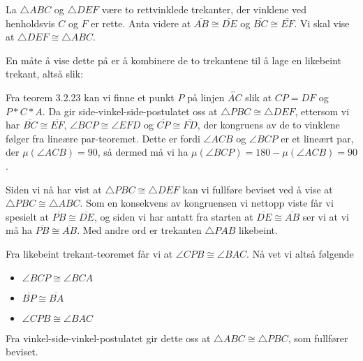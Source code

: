 \begin{oppgave}[4.2.4]
    La $\triangle ABC$ og $\triangle DEF$ være to rettvinklede trekanter, der vinklene ved henholdsvis $C$ og $F$ er rette. 
    Anta videre at $\overline{AB}\cong \overline{DE}$ og $\overline{BC}\cong \overline{EF}$. 
    Vi skal vise at $\triangle DEF \cong \triangle ABC$. 

    En måte å vise dette på er å kombinere de to trekantene til å lage en likebeint trekant, altså slik: 

    \begin{figure}[H]
        \centering
        
    \end{figure}

    Fra teorem 3.2.23 kan vi finne et punkt $P$ på linjen $\overleftrightarrow{AC}$ slik at $CP=DF$ og $P\ast C\ast A$. 
    Da gir side-vinkel-side-postulatet oss at $\triangle PBC\cong \triangle DEF$, ettersom vi har $\overline{BC}\cong \overline{EF}$, $\angle BCP \cong \angle EFD$ og $\overline{CP}\cong \overline{FD}$, der kongruens av de to vinklene følger fra lineære par-teoremet. 
    Dette er fordi $\angle ACB$ og $\angle BCP$ er et lineært par, der $\mu(\angle ACB)=90$, så dermed må vi ha $\mu(\angle BCP)=180-\mu(\angle ACB)=90$. 
    
    Siden vi nå har vist at $\triangle PBC\cong \triangle DEF$ kan vi fullføre beviset ved å vise at $\triangle PBC\cong \triangle ABC$. 
    Som en konsekvens av kongruensen vi nettopp viste får vi spesielt at $\overline{PB}\cong \overline{DE}$, og siden vi har antatt fra starten at $\overline{DE}\cong \overline{AB}$ ser vi at vi må ha $\overline{PB}\cong \overline{AB}$. 
    Med andre ord er trekanten $\triangle PAB$ likebeint. 

    Fra likebeint trekant-teoremet får vi at $\angle CPB \cong \angle BAC$. Nå vet vi altså følgende 
    \begin{itemize}
        \item $\angle BCP \cong \angle BCA$
        \item $\overline{BP}\cong \overline{BA}$
        \item $\angle CPB \cong \angle BAC$
    \end{itemize}
    Fra vinkel-side-vinkel-postulatet gir dette oss at $\triangle ABC\cong \triangle PBC$, som fullfører beviset. 
\end{oppgave}